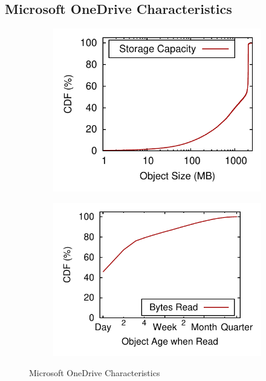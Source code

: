 \subsection{Microsoft OneDrive Characteristics}

\begin{figure}[tp]
\begin{subfigure}{.25\textwidth}
  \centering
  \includegraphics[width=\linewidth]{data/object_size-storage_capacity}
  \caption{}
  \label{fig:object_size-storage_capacity}
\end{subfigure}%
\begin{subfigure}{.25\textwidth}
  \centering
  \includegraphics[width=\linewidth]{data/write_read_gap-bytes_read}
  \caption{}
  \label{fig:write_read_gap-bytes_read}
\end{subfigure}%
\caption{Microsoft OneDrive Characteristics}
\label{fig:case_for_giza}
\end{figure}

